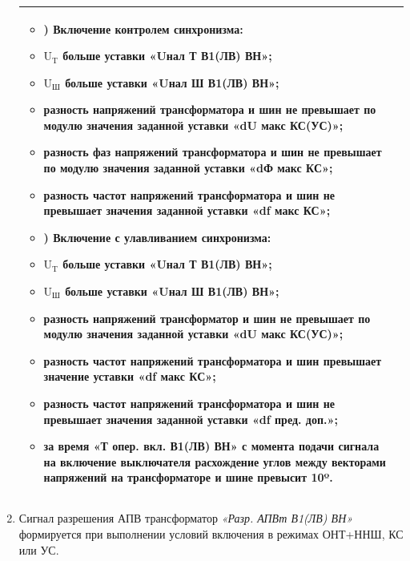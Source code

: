 \begin{enumerate}[label=\arabic{section}.\arabic{subsection}.\arabic{subsubsection}.\arabic*,  align=left, labelsep=4pt, leftmargin=0pt, itemindent=57pt]
\begin{longtable}{|>{\centering\arraybackslash}m{5.3cm}|>{\centering\arraybackslash}m{11.6cm}|}
			\begin{itemize}
			\item[] \noindent 1) Включение контролем синхронизма:
			\item $ \textrm{U}_\textrm{T} $ больше уставки \textbf{«Uнал Т В1(ЛВ) ВН»};
			\item $ \textrm{U}_\textrm{Ш} $ больше уставки \textbf{«Uнал Ш В1(ЛВ) ВН»};
			\item разность напряжений трансформатора и шин не превышает по модулю значения заданной уставки \textbf{«dU макс КС(УС)»};
			\item разность фаз напряжений трансформатора и шин не превышает по модулю значения заданной уставки \textbf{«dФ макс КС»};
			\item разность частот напряжений трансформатора и шин не превышает значения заданной уставки \textbf{«df макс КС»};
			\end{itemize}
			
			\begin{itemize}
			\item[] \noindent  2) Включение с улавливанием синхронизма:
			\item $ \textrm{U}_\textrm{T} $ больше уставки \textbf{«Uнал Т В1(ЛВ) ВН»};
			\item $ \textrm{U}_\textrm{Ш} $ больше уставки \textbf{«Uнал Ш В1(ЛВ) ВН»};
			\item разность напряжений трансформатор и шин не превышает по модулю значения заданной уставки \textbf{«dU макс КС(УС)»};
			\item разность частот напряжений трансформатора и шин превышает значение уставки \textbf{«df макс КС»};
			\item разность частот напряжений трансформатора и шин не превышает значения заданной уставки \textbf{«df пред. доп.»};
			\item за время \textbf{«Т опер. вкл. В1(ЛВ) ВН»} с момента подачи сигнала на включение выключателя расхождение углов между векторами напряжений на трансформаторе и шине превысит 10º.
			\vspace{3pt}
			\end{itemize} \\
\hline

\end{longtable}
\normalsize	

\item
Сигнал разрешения АПВ трансформатор \textit{«Разр. АПВт В1(ЛВ) ВН»} формируется при выполнении
условий включения в режимах ОНТ+ННШ, КС или УС.


\end{enumerate}
